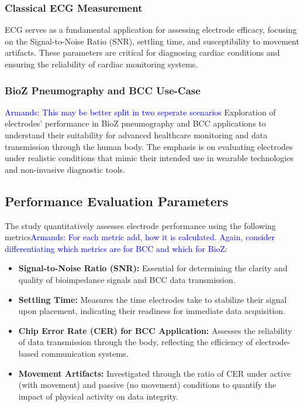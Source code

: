 \documentclass[conference]{IEEEtran}
\newcommand{\notea}[1]{\textcolor{blue}{Armands: #1}}
\begin{document}
\subsubsection{Classical ECG Measurement}
ECG serves as a fundamental application for assessing electrode efficacy, focusing on the Signal-to-Noise Ratio (SNR), settling time, and susceptibility to movement artifacts. These parameters are critical for diagnosing cardiac conditions and ensuring the reliability of cardiac monitoring systems.

\subsubsection{BioZ Pneumography and BCC Use-Case}
\notea{This may be better split in two seperate scenarios}
Exploration of electrodes' performance in BioZ pneumography and BCC applications to understand their suitability for advanced healthcare monitoring and data transmission through the human body. The emphasis is on evaluating electrodes under realistic conditions that mimic their intended use in wearable technologies and non-invasive diagnostic tools.

\subsection{Performance Evaluation Parameters}
The study quantitatively assesses electrode performance using the following metrics\notea{For each metric add, how it is calculated. Again, consider differentiating which metrics are for BCC and which for BioZ}:
\begin{itemize}
    \item \textbf{Signal-to-Noise Ratio (SNR):} Essential for determining the clarity and quality of bioimpedance signals and BCC data transmission.
    
    \item \textbf{Settling Time:} Measures the time electrodes take to stabilize their signal upon placement, indicating their readiness for immediate data acquisition.
    
    \item \textbf{Chip Error Rate (CER) for BCC Application:} Assesses the reliability of data transmission through the body, reflecting the efficiency of electrode-based communication systems.
    
    \item \textbf{Movement Artifacts:} Investigated through the ratio of CER under active (with movement) and passive (no movement) conditions to quantify the impact of physical activity on data integrity.
\end{itemize}
\end{document}
